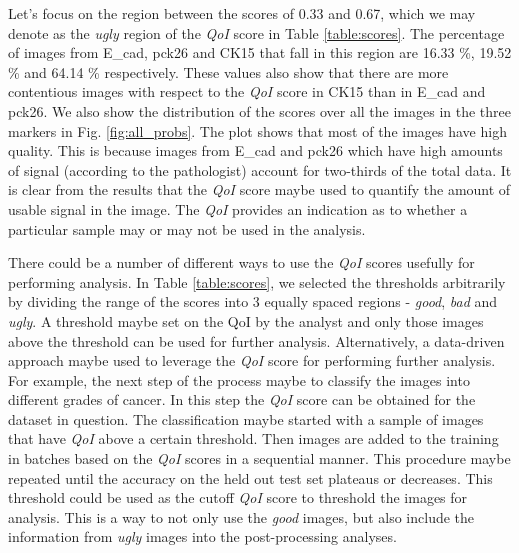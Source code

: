 Let's focus on the region between the scores of 0.33 and 0.67, which we may denote as the \textit{ugly} region of the \textit{QoI} score in Table \ref{table:scores}. The percentage of images from E\_cad, pck26 and CK15 that fall in this region are 16.33 \%, 19.52 \% and 64.14 \% respectively. These values also show that there are more contentious images  with respect to the \textit{QoI} score in CK15 than in E\_cad and pck26.
We also show  the distribution of the scores over all the images in the three markers in Fig. \ref{fig:all_probs}. The plot shows that most of the images have high quality. This is because images from E\_cad and pck26 which have high amounts of signal (according to the pathologist) account for two-thirds of the total data.
It is clear from the results that the \textit{QoI} score maybe used to quantify the amount of usable signal in the image.  The \textit{QoI}  provides an indication as to whether a particular sample may or may not be used in the analysis. 

There could be a number of different ways to use the \textit{QoI} scores usefully for performing analysis. In Table \ref{table:scores}, we selected the thresholds arbitrarily by dividing the range of the scores into 3 equally spaced regions - \textit{good}, \textit{bad} and \textit{ugly}.  A threshold maybe set on the QoI by the analyst and only those images above the threshold can be used for further analysis. Alternatively, a data-driven approach maybe used to leverage the \textit{QoI} score for performing further analysis. For example, the next step of the process maybe to classify the images into different grades of cancer.
In this step the \textit{QoI} score can be obtained for the dataset in question. The classification maybe started with a sample of images that have \textit{QoI} above a certain threshold. Then images are added to the training in batches based on the \textit{QoI} scores in a sequential manner. This procedure maybe repeated until the accuracy on the held out test set plateaus or decreases. This threshold could be used as the cutoff \textit{QoI} score to threshold the images for analysis. This is a way to not only use the \textit{good} images, but also include the information from \textit{ugly} images into the post-processing analyses.

